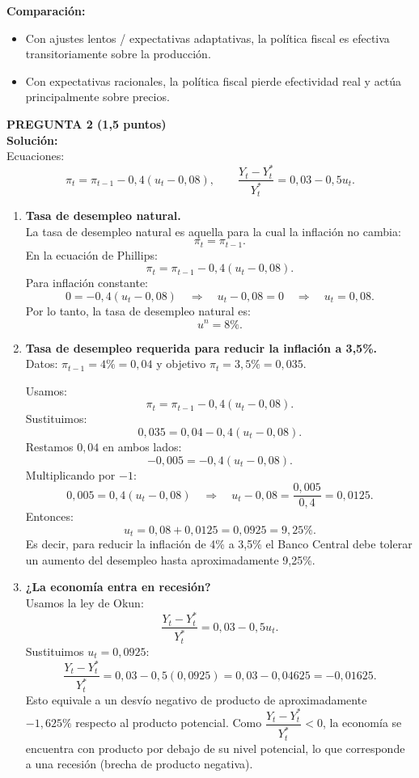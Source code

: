 \documentclass[11pt,addpoints]{article}
\begin{document}
\textbf{Comparación:}
\begin{itemize}
  \item Con ajustes lentos / expectativas adaptativas, la política fiscal es efectiva transitoriamente sobre la producción.
  \item Con expectativas racionales, la política fiscal pierde efectividad real y actúa principalmente sobre precios.
\end{itemize}


\textbf{PREGUNTA 2 (1,5 puntos)}\\
\textbf{Solución:}\\

Ecuaciones:
\[
\pi_t = \pi_{t-1} - 0{,}4(u_t - 0{,}08),
\qquad
\frac{Y_t - Y_t^*}{Y_t^*} = 0{,}03 - 0{,}5u_t.
\]

\begin{enumerate}[label=\alph*)]
  \item \textbf{Tasa de desempleo natural.}\\[0.1cm]
  La tasa de desempleo natural es aquella para la cual la inflación no cambia:
  \[
  \pi_t = \pi_{t-1}.
  \]
  En la ecuación de Phillips:
  \[
  \pi_t = \pi_{t-1} - 0{,}4(u_t - 0{,}08).
  \]
  Para inflación constante:
  \[
  0 = -0{,}4(u_t - 0{,}08)
  \quad\Rightarrow\quad
  u_t - 0{,}08 = 0
  \quad\Rightarrow\quad
  u_t = 0{,}08.
  \]
  Por lo tanto, la tasa de desempleo natural es:
  \[
  u^n = 8\%.
  \]
\newpage
\vspace*{0.5cm}

  \item \textbf{Tasa de desempleo requerida para reducir la inflación a 3,5\%.}\\[0.1cm]
  Datos: $\pi_{t-1} = 4\% = 0{,}04$ y objetivo $\pi_t = 3{,}5\% = 0{,}035$.

  Usamos:
  \[
  \pi_t = \pi_{t-1} - 0{,}4(u_t - 0{,}08).
  \]
  Sustituimos:
  \[
  0{,}035 = 0{,}04 - 0{,}4(u_t - 0{,}08).
  \]
  Restamos $0{,}04$ en ambos lados:
  \[
  -0{,}005 = -0{,}4(u_t - 0{,}08).
  \]
  Multiplicando por $-1$:
  \[
  0{,}005 = 0{,}4(u_t - 0{,}08)
  \quad\Rightarrow\quad
  u_t - 0{,}08 = \frac{0{,}005}{0{,}4} = 0{,}0125.
  \]
  Entonces:
  \[
  u_t = 0{,}08 + 0{,}0125 = 0{,}0925 = 9{,}25\%.
  \]
  Es decir, para reducir la inflación de 4\% a 3,5\% el Banco Central debe tolerar un aumento del desempleo hasta aproximadamente 9,25\%.

  \item \textbf{¿La economía entra en recesión?}\\[0.1cm]
  Usamos la ley de Okun:
  \[
  \frac{Y_t - Y_t^*}{Y_t^*} = 0{,}03 - 0{,}5u_t.
  \]
  Sustituimos $u_t = 0{,}0925$:
  \[
  \frac{Y_t - Y_t^*}{Y_t^*}
  = 0{,}03 - 0{,}5(0{,}0925)
  = 0{,}03 - 0{,}04625
  = -0{,}01625.
  \]
  Esto equivale a un desvío negativo de producto de aproximadamente $-1{,}625\%$ respecto al producto potencial. Como $\dfrac{Y_t - Y_t^*}{Y_t^*} < 0$, la economía se encuentra con producto por debajo de su nivel potencial, lo que corresponde a una recesión (brecha de producto negativa).
\end{enumerate}
\end{document}
